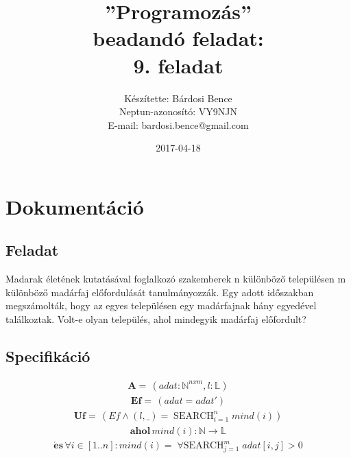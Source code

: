 \documentclass[a4paper]{article}
\title{”Programozás”\\ beadandó feladat:\\ 9. feladat}
\date{2017-04-18}
\author{Készítette: Bárdosi Bence\\ Neptun-azonosító: VY9NJN\\ E-mail: bardosi.bence@gmail.com}
\DeclareMathOperator*{\search}{SEARCH}
\DeclareMathOperator*{\mindSearch}{\forall SEARCH}
\begin{document}
  \maketitle
  \newpage

  \tableofcontents
  \newpage

  \section{Dokumentáció}
    \subsection{Feladat}
    Madarak életének kutatásával foglalkozó szakemberek n különböző településen m különböző madárfaj előfordulását tanulmányozzák. Egy adott időszakban megszámolták, hogy az egyes településen egy madárfajnak hány egyedével találkoztak.
    Volt-e olyan település, ahol mindegyik madárfaj előfordult?
    \subsection{Specifikáció}
        \begin{align*}
          \mathbf{A=}\, \left ( adat: \mathbb{N}^{n x m} , l: \mathbb{L} \right )
        \end{align*}
        \begin{align*}
          \mathbf{Ef=}\, \left ( adat=adat' \right )
        \end{align*}
        \begin{align*}
          \mathbf{Uf=}\, \left ( Ef \wedge (l,\_)=\search_{i=1}^n mind(i) \right )
        \end{align*}
        \begin{align*}
          \mathbf{ahol}\, mind(i): \mathbb{N} \rightarrow \mathbb{L}
        \end{align*}
        \begin{align*}
          \mathbf{\acute{e}s}\, \forall i \in [1..n]: mind(i)=\mindSearch_{j=1}^{m} adat[i,j]>0
        \end{align*}
\end{document}
